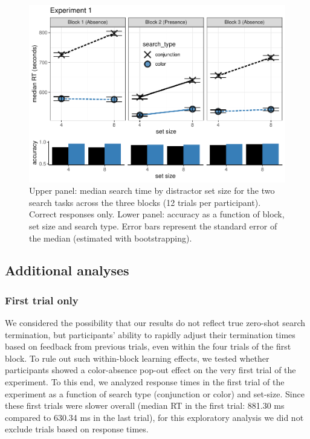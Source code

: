 \documentclass[
  english,
  man]{apa6}
\begin{document}
\begin{figure}[H]
\includegraphics[width=\textwidth]{termination_files/figure-latex/exp1Plot-1} \caption{Upper panel: median search time by distractor set size for the two search tasks across the three blocks (12 trials per participant). Correct responses only. Lower panel: accuracy as a function of block, set size and search type. Error bars represent the standard error of the median (estimated with bootstrapping).}\label{fig:exp1Plot}
\end{figure}

\hypertarget{additional-analyses}{%
\subsection{Additional analyses}\label{additional-analyses}}

\hypertarget{first-trial-only}{%
\subsubsection{First trial only}\label{first-trial-only}}

We considered the possibility that our results do not reflect true zero-shot search termination, but participants' ability to rapidly adjust their termination times based on feedback from previous trials, even within the four trials of the first block. To rule out such within-block learning effects, we tested whether participants showed a color-absence pop-out effect on the very first trial of the experiment. To this end, we analyzed response times in the first trial of the experiment as a function of search type (conjunction or color) and set-size. Since these first trials were slower overall (median RT in the first trial: 881.30 ms compared to 630.34 ms in the last trial), for this exploratory analysis we did not exclude trials based on response times.
\end{document}
